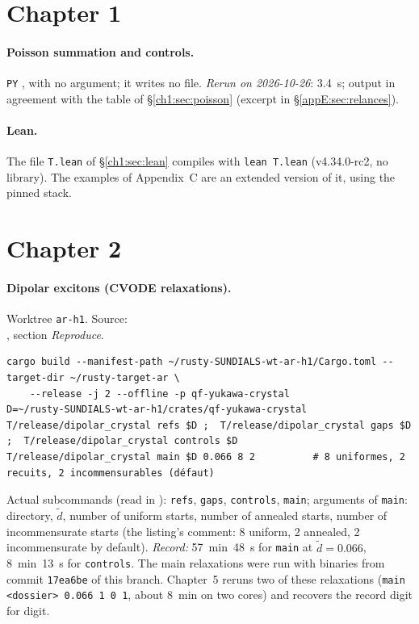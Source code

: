 \section{Chapter 1}\label{appE:sec:ch1}

\paragraph{Poisson summation and controls.} \texttt{PY} ,
with no argument; it writes no file. \emph{Rerun on 2026-10-26}: 3.4~s; output in agreement with the table of
§\ref{ch1:sec:poisson} (excerpt in §\ref{appE:sec:relances}).

\paragraph{Lean.} The file \texttt{T.lean} of §\ref{ch1:sec:lean} compiles with \texttt{lean T.lean} (v4.34.0-rc2, no
library). The examples of Appendix~C are an extended version of it, using the pinned stack.

\section{Chapter 2}\label{appE:sec:ch2}

\paragraph{Dipolar excitons (CVODE relaxations).} Worktree \texttt{ar-h1}. Source:\\ , section \emph{Reproduce}.
\begin{lstlisting}[style=appC,language={}]
cargo build --manifest-path ~/rusty-SUNDIALS-wt-ar-h1/Cargo.toml --target-dir ~/rusty-target-ar \
    --release -j 2 --offline -p qf-yukawa-crystal
D=~/rusty-SUNDIALS-wt-ar-h1/crates/qf-yukawa-crystal
T/release/dipolar_crystal refs $D ;  T/release/dipolar_crystal gaps $D ;  T/release/dipolar_crystal controls $D
T/release/dipolar_crystal main $D 0.066 8 2          # 8 uniformes, 2 recuits, 2 incommensurables (défaut)
\end{lstlisting}
Actual subcommands (read in ): \texttt{refs}, \texttt{gaps}, \texttt{controls},
\texttt{main}; arguments of \texttt{main}: directory, $\tilde d$, number of uniform starts, number of annealed starts,
number of incommensurate starts (the listing's comment: 8 uniform, 2 annealed, 2 incommensurate by default).
\emph{Record:} 57~min~48~s for \texttt{main} at $\tilde d=0.066$, 8~min~13~s for \texttt{controls}. The main relaxations
were run with binaries from commit \texttt{17ea6be} of this branch. Chapter~5 reruns two of these relaxations
(\texttt{main <dossier> 0.066 1 0 1}, about 8~min on two cores) and recovers the record digit for digit.


